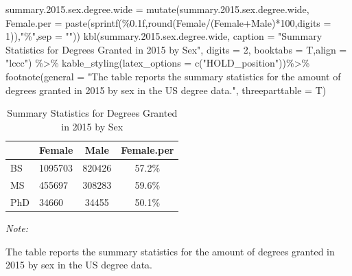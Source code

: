 \documentclass[
  12pt,
]{article}
\newenvironment{Shaded}{\begin{snugshade}}{\end{snugshade}}
\newcommand{\AttributeTok}[1]{\textcolor[rgb]{0.77,0.63,0.00}{#1}}
\newcommand{\DecValTok}[1]{\textcolor[rgb]{0.00,0.00,0.81}{#1}}
\newcommand{\FloatTok}[1]{\textcolor[rgb]{0.00,0.00,0.81}{#1}}
\newcommand{\FunctionTok}[1]{\textcolor[rgb]{0.00,0.00,0.00}{#1}}
\newcommand{\NormalTok}[1]{#1}
\newcommand{\OtherTok}[1]{\textcolor[rgb]{0.56,0.35,0.01}{#1}}
\newcommand{\SpecialCharTok}[1]{\textcolor[rgb]{0.00,0.00,0.00}{#1}}
\newcommand{\StringTok}[1]{\textcolor[rgb]{0.31,0.60,0.02}{#1}}
\begin{document}
\begin{Shaded}
\begin{Highlighting}[]
\NormalTok{summary.}\FloatTok{2015.}\NormalTok{sex.degree.wide }\OtherTok{=} \FunctionTok{mutate}\NormalTok{(summary.}\FloatTok{2015.}\NormalTok{sex.degree.wide,}
                                      \AttributeTok{Female.per =} \FunctionTok{paste}\NormalTok{(}\FunctionTok{sprintf}\NormalTok{(}\StringTok{\textquotesingle{}\%0.1f\textquotesingle{}}\NormalTok{,}\FunctionTok{round}\NormalTok{(Female}\SpecialCharTok{/}\NormalTok{(Female}\SpecialCharTok{+}\NormalTok{Male)}\SpecialCharTok{*}\DecValTok{100}\NormalTok{,}\AttributeTok{digits =} \DecValTok{1}\NormalTok{)),}\StringTok{"\%"}\NormalTok{,}\AttributeTok{sep =} \StringTok{""}\NormalTok{))}
\FunctionTok{kbl}\NormalTok{(summary.}\FloatTok{2015.}\NormalTok{sex.degree.wide, }\AttributeTok{caption =} \StringTok{"Summary Statistics for Degrees Granted in 2015 by Sex"}\NormalTok{, }\AttributeTok{digits =} \DecValTok{2}\NormalTok{, }\AttributeTok{booktabs =}\NormalTok{ T,}\AttributeTok{align =} \StringTok{"lccc"}\NormalTok{) }\SpecialCharTok{\%\textgreater{}\%}
  \FunctionTok{kable\_styling}\NormalTok{(}\AttributeTok{latex\_options =} \FunctionTok{c}\NormalTok{(}\StringTok{"HOLD\_position"}\NormalTok{))}\SpecialCharTok{\%\textgreater{}\%}
   \FunctionTok{footnote}\NormalTok{(}\AttributeTok{general =} \StringTok{"The table reports the summary statistics for the amount of degrees granted in 2015 by sex in the US degree data."}\NormalTok{,}
            \AttributeTok{threeparttable =}\NormalTok{ T)}
\end{Highlighting}
\end{Shaded}

\begin{table}[H]

\caption{\label{tab:unnamed-chunk-9}Summary Statistics for Degrees Granted in 2015 by Sex}
\centering
\begin{threeparttable}
\begin{tabular}[t]{llcc}
\toprule
  & Female & Male & Female.per\\
\midrule
BS & 1095703 & 820426 & 57.2\%\\
MS & 455697 & 308283 & 59.6\%\\
PhD & 34660 & 34455 & 50.1\%\\
\bottomrule
\end{tabular}
\begin{tablenotes}
\item \textit{Note: } 
\item The table reports the summary statistics for the amount of degrees granted in 2015 by sex in the US degree data.
\end{tablenotes}
\end{threeparttable}
\end{table}
\end{document}
